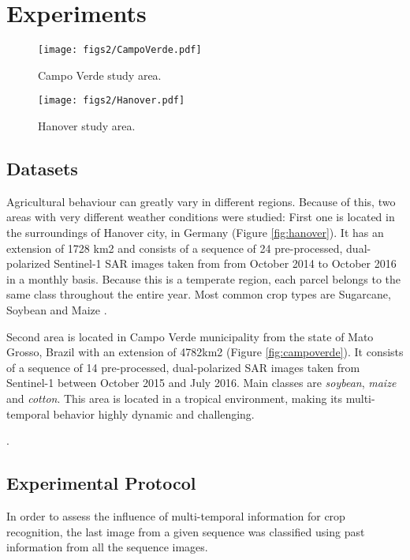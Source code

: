 \section{Experiments}

\begin{figure}[t!]
\label{fig:campoverde}
\centering
\texttt{[image: figs2/CampoVerde.pdf]}
\caption{Campo Verde study area.}
\label{fig:labels}
\end{figure}

\begin{figure}[t!]
\label{fig:hanover}
\centering
\texttt{[image: figs2/Hanover.pdf]}
\caption{Hanover study area.}
\label{fig:labels}
\end{figure}
\subsection{Datasets}

Agricultural behaviour can greatly vary in different regions. Because of this, two areas with very different weather conditions were studied: First one is located in the surroundings of Hanover city, in Germany (Figure \ref{fig:hanover}). It has an extension of 1728 km2 and consists of a sequence of 24 pre-processed, dual-polarized Sentinel-1 SAR images taken from from October 2014 to October 2016 in a monthly basis. Because this is a temperate region, each parcel belongs to the same class throughout the entire year. Most common crop types are Sugarcane, Soybean and Maize \cite{bargiel2017new}.

Second area is located in Campo Verde municipality from the state of Mato Grosso, Brazil with an extension of 4782km2 (Figure \ref{fig:campoverde}). It consists of a sequence of 14 pre-processed, dual-polarized SAR images taken from Sentinel-1 between October 2015 and July 2016. Main classes are \textit{soybean}, \textit{maize} and \textit{cotton}. This area is located in a tropical environment, making its multi-temporal behavior highly dynamic and challenging. 


\cite{sanches2018campo}.






\subsection{Experimental Protocol}

In order to assess the influence of multi-temporal information for crop recognition, the last image from a given sequence was classified using past information from all the sequence images.

